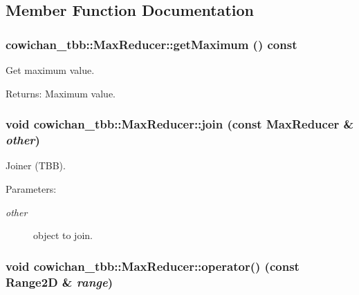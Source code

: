 \subsection{Member Function Documentation}
\hypertarget{classcowichan__tbb_1_1_max_reducer_e4c54bf79d09499d4f91457a45a06a08}{
\subsubsection[{getMaximum}]{ cowichan\_\-tbb::MaxReducer::getMaximum () const}}
\label{classcowichan__tbb_1_1_max_reducer_e4c54bf79d09499d4f91457a45a06a08}


Get maximum value. \begin{Desc}
\item[Returns:]Maximum value. \end{Desc}
\hypertarget{classcowichan__tbb_1_1_max_reducer_ebeb8ee596f035a94d638b497135343b}{
\subsubsection[{join}]{\setlength{\rightskip}{0pt plus 5cm}void cowichan\_\-tbb::MaxReducer::join (const {\bf MaxReducer} \& {\em other})}}
\label{classcowichan__tbb_1_1_max_reducer_ebeb8ee596f035a94d638b497135343b}


Joiner (TBB). \begin{Desc}
\item[Parameters:]
\begin{description}
\item[{\em other}]object to join. \end{description}
\end{Desc}
\hypertarget{classcowichan__tbb_1_1_max_reducer_a3ee1f93e3d1cf88da3669dfe73108f9}{
\subsubsection[{operator()}]{\setlength{\rightskip}{0pt plus 5cm}void cowichan\_\-tbb::MaxReducer::operator() (const {\bf Range2D} \& {\em range})}}
\label{classcowichan__tbb_1_1_max_reducer_a3ee1f93e3d1cf88da3669dfe73108f9}


